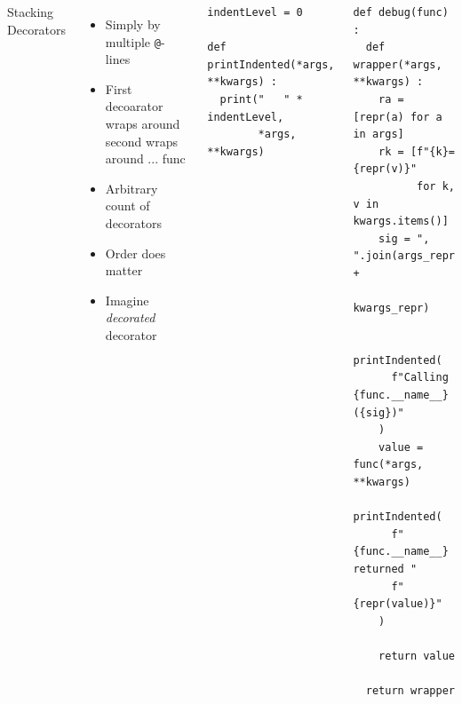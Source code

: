 
\begin{frame}[fragile]
%
\begin{columns}[T]
\begin{Large}
	{Stacking Decorators}
	\vspace{12pt}
\end{Large}
\begin{itemize}
\item Simply by multiple \texttt{@}-lines
\item First decoarator wraps around second wraps around ... func
\item Arbitrary count of decorators
\item Order does matter
\item Imagine \emph{decorated} decorator
\end{itemize}
%
\vspace{15pt}
\begin{codebox}
\begin{verbatim}
indentLevel = 0

def printIndented(*args, **kwargs) :
  print("   " * indentLevel,
        *args, **kwargs)
\end{verbatim}
\end{codebox}
%
\begin{codebox}[... continued]
\begin{verbatim}
def debug(func) :
  def wrapper(*args, **kwargs) :
    ra = [repr(a) for a in args]
    rk = [f"{k}={repr(v)}"
          for k, v in kwargs.items()]
    sig = ", ".join(args_repr + 
                    kwargs_repr)
        
    printIndented(
      f"Calling {func.__name__}({sig})"
    )
    value = func(*args, **kwargs)
    printIndented(
      f"{func.__name__} returned "
      f"{repr(value)}"
    )
        
    return value
    
  return wrapper
\end{verbatim}
\end{codebox}
\end{columns}
%
\end{frame}


